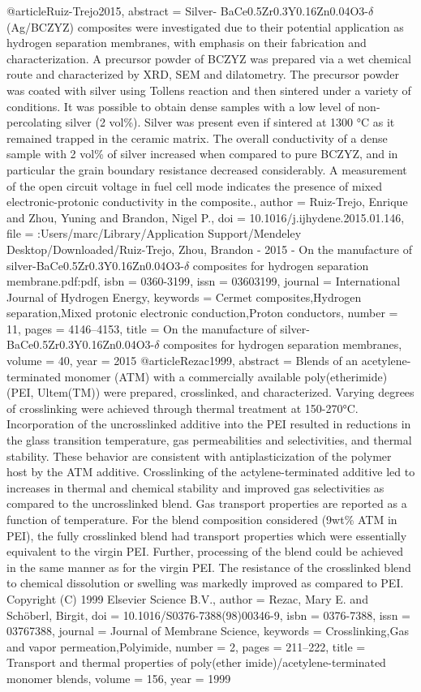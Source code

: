 @article{Ruiz-Trejo2015,
abstract = {Silver- BaCe0.5Zr0.3Y0.16Zn0.04O3-$\delta$ (Ag/BCZYZ) composites were investigated due to their potential application as hydrogen separation membranes, with emphasis on their fabrication and characterization. A precursor powder of BCZYZ was prepared via a wet chemical route and characterized by XRD, SEM and dilatometry. The precursor powder was coated with silver using Tollens reaction and then sintered under a variety of conditions. It was possible to obtain dense samples with a low level of non-percolating silver (2 vol{\%}). Silver was present even if sintered at 1300 °C as it remained trapped in the ceramic matrix. The overall conductivity of a dense sample with 2 vol{\%} of silver increased when compared to pure BCZYZ, and in particular the grain boundary resistance decreased considerably. A measurement of the open circuit voltage in fuel cell mode indicates the presence of mixed electronic-protonic conductivity in the composite.},
author = {Ruiz-Trejo, Enrique and Zhou, Yuning and Brandon, Nigel P.},
doi = {10.1016/j.ijhydene.2015.01.146},
file = {:Users/marc/Library/Application Support/Mendeley Desktop/Downloaded/Ruiz-Trejo, Zhou, Brandon - 2015 - On the manufacture of silver-BaCe0.5Zr0.3Y0.16Zn0.04O3-$\delta$ composites for hydrogen separation membrane.pdf:pdf},
isbn = {0360-3199},
issn = {03603199},
journal = {International Journal of Hydrogen Energy},
keywords = {Cermet composites,Hydrogen separation,Mixed protonic electronic conduction,Proton conductors},
number = {11},
pages = {4146--4153},
title = {{On the manufacture of silver-BaCe0.5Zr0.3Y0.16Zn0.04O3-$\delta$ composites for hydrogen separation membranes}},
volume = {40},
year = {2015}
}
@article{Rezac1999,
abstract = {Blends of an acetylene-terminated monomer (ATM) with a commercially available poly(etherimide) (PEI, Ultem(TM)) were prepared, crosslinked, and characterized. Varying degrees of crosslinking were achieved through thermal treatment at 150-270°C. Incorporation of the uncrosslinked additive into the PEI resulted in reductions in the glass transition temperature, gas permeabilities and selectivities, and thermal stability. These behavior are consistent with antiplasticization of the polymer host by the ATM additive. Crosslinking of the actylene-terminated additive led to increases in thermal and chemical stability and improved gas selectivities as compared to the uncrosslinked blend. Gas transport properties are reported as a function of temperature. For the blend composition considered (9wt{\%} ATM in PEI), the fully crosslinked blend had transport properties which were essentially equivalent to the virgin PEI. Further, processing of the blend could be achieved in the same manner as for the virgin PEI. The resistance of the crosslinked blend to chemical dissolution or swelling was markedly improved as compared to PEI. Copyright (C) 1999 Elsevier Science B.V.},
author = {Rezac, Mary E. and Sch{\"{o}}berl, Birgit},
doi = {10.1016/S0376-7388(98)00346-9},
isbn = {0376-7388},
issn = {03767388},
journal = {Journal of Membrane Science},
keywords = {Crosslinking,Gas and vapor permeation,Polyimide},
number = {2},
pages = {211--222},
title = {{Transport and thermal properties of poly(ether imide)/acetylene-terminated monomer blends}},
volume = {156},
year = {1999}
}
